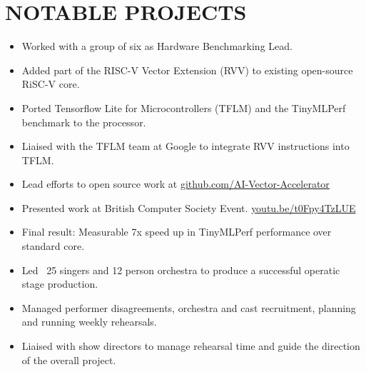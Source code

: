 

\section{NOTABLE PROJECTS}
\vspace{-4mm}
{
  {\begin{itemize}
    \item Worked with a group of six as Hardware Benchmarking Lead.
    \item Added part of the RISC-V Vector Extension (RVV) to existing open-source RiSC-V core.
    \item Ported Tensorflow Lite for Microcontrollers (TFLM) and the TinyMLPerf benchmark to the processor.
    \item Liaised with the TFLM team at Google to integrate RVV instructions into TFLM. 
    \item Lead efforts to open source work at \url{github.com/AI-Vector-Accelerator}
    \item Presented work at British Computer Society Event. \url{youtu.be/t0Fpy4TzLUE}
    \item Final result: Measurable 7x speed up in TinyMLPerf performance over standard core.
  \end{itemize} 
  }
}

{
  {\begin{itemize}
    \item Led ~25 singers and 12 person orchestra to produce a successful operatic stage production.
    \item Managed performer disagreements, orchestra and cast recruitment, planning and running weekly rehearsals.  
    \item Liaised with show directors to manage rehearsal time and guide the direction of the overall project.
  \end{itemize}
  }
}


